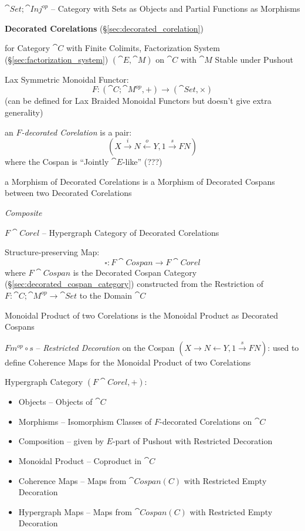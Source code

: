 $\cat{Set};\cat{Inj}^{op}$ -- Category with Sets as Objects and
Partial Functions as Morphisms


\textbf{Decorated Corelations} (\S\ref{sec:decorated_corelation})

for Category $\cat{C}$ with Finite Colimits, Factorization System
(\S\ref{sec:factorization_system}) $(\cat{E},\cat{M})$ on $\cat{C}$
with $\cat{M}$ Stable under Pushout

Lax Symmetric Monoidal Functor:
\[
  F : (\cat{C};\cat{M}^{op}, +) \rightarrow (\cat{Set}, \times)
\]
(can be defined for Lax Braided Monoidal Functors but doesn't give
extra generality)

an \emph{$F$-decorated Corelation} is a pair:
\[
  (X \xrightarrow{i} N \xleftarrow{o} Y, 1 \xrightarrow{s} F N)
\]
where the Cospan is ``Jointly $\cat{E}$-like'' (???) %

a Morphism of Decorated Corelations is a Morphism of Decorated Cospans
between two Decorated Corelations


\emph{Composite} %


\asterism


$F\cat{Corel}$ -- Hypergraph Category of Decorated Corelations

Structure-preserving Map:
\[
  \square : F\cat{Cospan} \rightarrow F\cat{Corel}
\]
where $F\cat{Cospan}$ is the Decorated Cospan Category
(\S\ref{sec:decorated_cospan_category}) constructed from the
Restriction of $F : \cat{C};\cat{M}^{op} \rightarrow \cat{Set}$ to the
Domain $\cat{C}$

Monoidal Product of two Corelations is the Monoidal Product as
Decorated Cospans

$F m^{op} \circ s$ -- \emph{Restricted Decoration} on the Cospan $(X
\rightarrow N \leftarrow Y, 1 \xrightarrow{s} F N)$: used to define
Coherence Maps for the Monoidal Product of two Corelations

Hypergraph Category $(F\cat{Corel}, +)$:
\begin{itemize}
  \item Objects -- Objects of $\cat{C}$
  \item Morphisms -- Isomorphism Classes of $F$-decorated Corelations
    on $\cat{C}$
  \item Composition -- given by $E$-part of Pushout with Restricted
    Decoration %
  \item Monoidal Product -- Coproduct in $\cat{C}$
  \item Coherence Maps -- Maps from $\cat{Cospan(C)}$ with Restricted
    Empty Decoration
  \item Hypergraph Maps -- Maps from $\cat{Cospan(C)}$ with Restricted
    Empty Decoration
\end{itemize}

